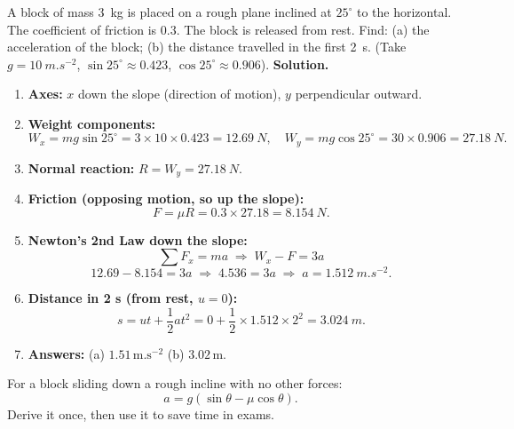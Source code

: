 \documentclass[11pt]{article}
\begin{document}
\begin{exoresolu}
A block of mass \SI{3}{kg} is placed on a rough plane inclined at $25^\circ$ to the horizontal. The coefficient of friction is $0.3$. The block is released from rest. Find: (a) the acceleration of the block; (b) the distance travelled in the first \SI{2}{s}. (Take $g = \SI{10}{m.s^{-2}}$, $\sin 25^\circ \approx 0.423$, $\cos 25^\circ \approx 0.906$).
\tcblower
\textbf{Solution.}
\begin{enumerate}
    \item \textbf{Axes:} $x$ down the slope (direction of motion), $y$ perpendicular outward.
    \item \textbf{Weight components:}
    \[
    W_x = mg\sin 25^\circ = 3 \times 10 \times 0.423 = \SI{12.69}{N},\quad
    W_y = mg\cos 25^\circ = 30 \times 0.906 = \SI{27.18}{N}.
    \]
    \item \textbf{Normal reaction:} $R = W_y = \SI{27.18}{N}$.
    \item \textbf{Friction (opposing motion, so up the slope):}
    \[
    F = \mu R = 0.3 \times 27.18 = \SI{8.154}{N}.
    \]
    \item \textbf{Newton's 2nd Law down the slope:}
    \[
    \sum F_x = m a \;\Longrightarrow\; W_x - F = 3 a
    \]
    \[
    12.69 - 8.154 = 3a \;\Longrightarrow\; 4.536 = 3a \;\Longrightarrow\; a = \SI{1.512}{m.s^{-2}}.
    \]
    \item \textbf{Distance in 2 s (from rest, $u=0$):}
    \[
    s = ut + \frac{1}{2}at^2 = 0 + \frac{1}{2} \times 1.512 \times 2^2 = \SI{3.024}{m}.
    \]
    \item \textbf{Answers:} (a) $\boldsymbol{1.51\,\mathrm{m.s^{-2}}}$ (b) $\boldsymbol{3.02\,\mathrm{m}}$.
\end{enumerate}
\begin{aretenir}
For a block sliding down a rough incline with no other forces:
\[
a = g(\sin\theta - \mu\cos\theta).
\]
Derive it once, then use it to save time in exams.
\end{aretenir}
\end{exoresolu}
\end{document}
